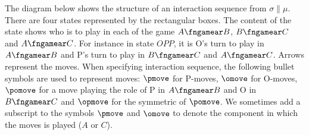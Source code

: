 The diagram below shows the structure of an interaction sequence
from $\sigma \parallel \mu$. There are four states represented by
the rectangular boxes. The content of the state shows who is to play
in each of the game $A\fngamear B$, $B\fngamear C$ and $A\fngamear
C$. For instance in state $OPP$, it is O's turn to play in
$A\fngamear B$ and P's turn to play in $B\fngamear C$ and
$A\fngamear C$. Arrows represent the moves. When specifying
interaction sequence, the following bullet symbols are used to
represent moves: $\pmove$ for P-moves, $\omove$ for O-moves,
$\pomove$ for a move playing the role of P in $A\fngamear B$ and O
in $B\fngamear C$ and $\opmove$ for the symmetric of $\pomove$. We
sometimes add a subscript to the symbols $\pmove$ and $\omove$ to
denote the component in which the moves is played ($A$ or $C$).



